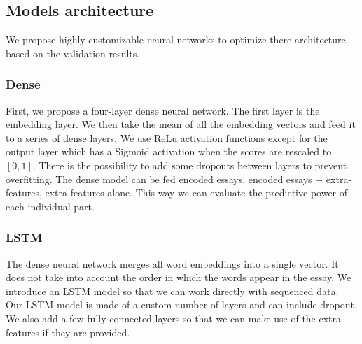 \documentclass[a4paper,12pt,english]{article}
\begin{document}
\subsection{Models architecture}
We propose highly customizable neural networks to optimize there architecture based on the validation results.
\subsubsection{Dense}
\label{pos:densearchi}
First, we propose a four-layer dense neural network.
The first layer is the embedding layer.
We then take the mean of all the embedding vectors and feed it to a series of dense layers.
We use ReLu activation functions except for the output layer which has a Sigmoid activation when the scores are rescaled to $[0,1]$.
There is the possibility to add some dropouts between layers to prevent overfitting.
The dense model can be fed encoded essays, encoded essays + extra-features, extra-features alone.
This way we can evaluate the predictive power of each individual part.
\subsubsection{LSTM}
The dense neural network merges all word embeddings into a single vector.
It does not take into account the order in which the words appear in the essay.
We introduce an LSTM model so that we can work directly with sequenced data.
Our LSTM model is made of a custom number of layers and can include dropout.
We also add a few fully connected layers so that we can make use of the extra-features if they are provided.
\end{document}
